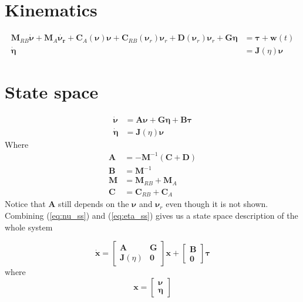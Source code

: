 \documentclass[12pt,a4]{article}
\begin{document}
\section{Kinematics}
\begin{align}
	\bm{M}_{RB}\bm{\dot{\nu}} + \bm{M}_{A}\bm{\dot{\nu_r}} + \bm{C}_{A}(\bm{\nu})\bm{\nu} + \bm{C}_{RB}(\bm{\nu}_r)\bm{\nu}_r
	+ \bm{D}(\bm{\nu}_r)\bm{\nu}_r +\bm{G}\bm{\eta} & = \bm{\tau} + \bm{w}(t) \\
	\bm{\dot{\eta}}                                 & = \bm{J}(\eta)\bm{\nu}
\end{align}
\section{State space}

\begin{align}
	\bm{\dot{\nu}}  & =	\bm{A}\bm{\nu}+\bm{G}\bm{\eta}+\bm{B}\bm{\tau} 		\label{eq:nu_ss} \\
	\bm{\dot{\eta}} & =	\bm{J}(\eta)\bm{\nu}								\label{eq:eta_ss}
\end{align}
Where
\begin{align}
	\bm{A} & = -\bm{M}^{-1}(\bm{C}+\bm{D}) \\
	\bm{B} & = \bm{M}^{-1}                 \\
	\bm{M} & = \bm{M}_{RB} + \bm{M}_{A}    \\
	\bm{C} & = \bm{C}_{RB} + \bm{C}_{A}
\end{align}
Notice that $\bm{A}$ still depends on the $\bm{\nu}$ and $\bm{\nu}_r$ even though it is not shown. Combining (\ref{eq:nu_ss}) and (\ref{eq:eta_ss}) gives us a state space description of the whole system

\begin{equation}
	\bm{\dot{x}} =	\begin{bmatrix} \bm{A} & \bm{G} \\ \bm{J}(\eta) & \bm{0} \end{bmatrix}\bm{x}
	+ \begin{bmatrix}	\bm{B} \\ \bm{0}	\end{bmatrix}\bm{\tau}
\end{equation}
where
\begin{equation}
	\bm{x} = 		\begin{bmatrix}		\bm{\nu}\\\bm{\eta}	\end{bmatrix}
\end{equation}
\end{document}
